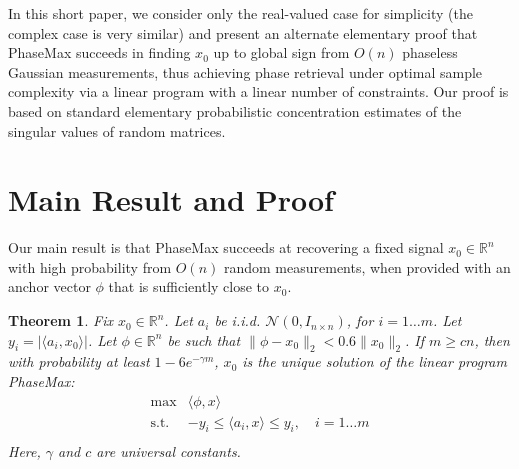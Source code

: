 \documentclass[12pt]{article}
\newcommand{\rank}{\operatorname{rank}}
\newcommand{\1}{\mathbf{1}}
\newcommand{\R}{\mathbb{R}}
\newtheorem{theorem}{Theorem} %
\begin{document}
In this short paper, we consider only the real-valued case for simplicity (the complex case is very similar) and present an alternate elementary proof that  PhaseMax succeeds in finding $x_0$ up to global sign from $O(n)$ phaseless Gaussian measurements, thus achieving phase retrieval under optimal sample complexity via a linear program with a linear number of constraints.  Our proof is based on standard elementary probabilistic concentration estimates of the singular values of random matrices.


\section{Main Result and Proof}
Our main result is that PhaseMax  succeeds at recovering a fixed signal $x_0\in \R^n$ with high probability from $O(n)$ random measurements, when provided with an anchor vector $\phi$ that is sufficiently close to $x_0$. 

\begin{theorem} \label{main-theorem}
Fix $x_0 \in \R^n$.  Let $a_i$ be i.i.d. $\mathcal{N}(0, I_{n \times n})$, for $i = 1\ldots m$.  Let $y_i = |\langle a_i, x_0\rangle |$.   
Let $\phi \in \mathbb{R}^n$ be such that $\|\phi-x_0\|_2 < 0.6 \|x_0\|_2$.  If $m \geq c n$, then with probability at least $1 - 6 e^{-\gamma m}$, $x_0$ is the unique solution of the linear program PhaseMax:
\begin{equation}\label{PhaseMax}
\begin{array}{ll}
\max & \langle \phi, x \rangle \\
\text{s.t.} & -y_i \leq \langle a_i, x \rangle \leq y_i, \quad  i = 1\ldots  m\\ 
\end{array}
\end{equation}
Here, $\gamma$ and $c$ are universal constants.
\end{theorem}
\end{document}
